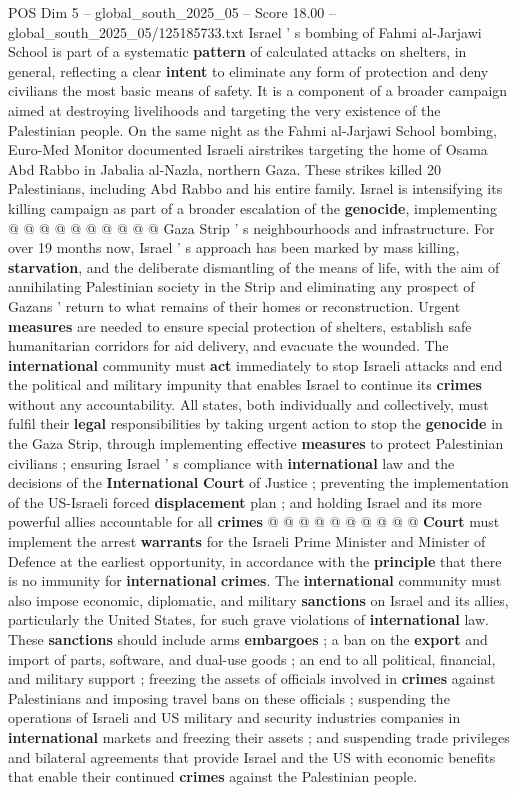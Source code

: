 \begin{textsample}{POS Dim 5 – global\_south\_2025\_05 – Score 18.00 – global\_south\_2025\_05/125185733.txt}
Israel ' s bombing of Fahmi al-Jarjawi School is part of a systematic \textbf{pattern} of calculated attacks on shelters, in general, reflecting a clear \textbf{intent} to eliminate any form of protection and deny civilians the most basic means of safety.
It is a component of a broader campaign aimed at destroying livelihoods and targeting the very existence of the Palestinian people.
On the same night as the Fahmi al-Jarjawi School bombing, Euro-Med Monitor documented Israeli airstrikes targeting the home of Osama Abd Rabbo in Jabalia al-Nazla, northern Gaza.
These strikes killed 20 Palestinians, including Abd Rabbo and his entire family.
Israel is intensifying its killing campaign as part of a broader escalation of the \textbf{genocide}, implementing @ @ @ @ @ @ @ @ @ @ Gaza Strip ' s neighbourhoods and infrastructure.
For over 19 months now, Israel ' s approach has been marked by mass killing, \textbf{starvation}, and the deliberate dismantling of the means of life, with the aim of annihilating Palestinian society in the Strip and eliminating any prospect of Gazans ' return to what remains of their homes or reconstruction.
Urgent \textbf{measures} are needed to ensure special protection of shelters, establish safe humanitarian corridors for aid delivery, and evacuate the wounded.
The \textbf{international} community must \textbf{act} immediately to stop Israeli attacks and end the political and military impunity that enables Israel to continue its \textbf{crimes} without any accountability.
All states, both individually and collectively, must fulfil their \textbf{legal} responsibilities by taking urgent action to stop the \textbf{genocide} in the Gaza Strip, through implementing effective \textbf{measures} to protect Palestinian civilians ; ensuring Israel ' s compliance with \textbf{international} law and the decisions of the \textbf{International} \textbf{Court} of Justice ; preventing the implementation of the US-Israeli forced \textbf{displacement} plan ; and holding Israel and its more powerful allies accountable for all \textbf{crimes} @ @ @ @ @ @ @ @ @ @ \textbf{Court} must implement the arrest \textbf{warrants} for the Israeli Prime Minister and Minister of Defence at the earliest opportunity, in accordance with the \textbf{principle} that there is no immunity for \textbf{international} \textbf{crimes}.
The \textbf{international} community must also impose economic, diplomatic, and military \textbf{sanctions} on Israel and its allies, particularly the United States, for such grave violations of \textbf{international} law.
These \textbf{sanctions} should include arms \textbf{embargoes} ; a ban on the \textbf{export} and import of parts, software, and dual-use goods ; an end to all political, financial, and military support ; freezing the assets of officials involved in \textbf{crimes} against Palestinians and imposing travel bans on these officials ; suspending the operations of Israeli and US military and security industries companies in \textbf{international} markets and freezing their assets ; and suspending trade privileges and bilateral agreements that provide Israel and the US with economic benefits that enable their continued \textbf{crimes} against the Palestinian people.

\end{textsample}
